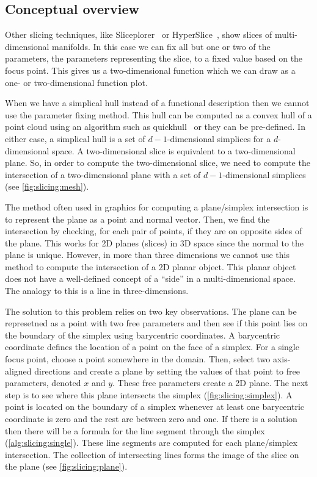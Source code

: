 \subsection{Conceptual overview}

Other slicing techniques, like Sliceplorer~\cite{Torsney-Weir:2017a} or
HyperSlice~\cite{Wijk:1993}, show slices of multi-dimensional manifolds.
In this case we can fix all but one or two of the
parameters, the parameters representing the slice, to a fixed value based on the
focus point. This gives us a two-dimensional function which we can draw as
a one- or two-dimensional function plot.

When we have a simplical hull instead of a functional description then we
cannot use the parameter fixing method. This hull can be computed as a convex
hull of a point cloud using an algorithm such as quickhull~\cite{Barber:1996}
or they can be pre-defined.  In either case, a simplical hull is a set of
\(d-1\)-dimensional simplices for a \(d\)-dimensional space. 
A two-dimensional
slice is equivalent to a two-dimensional plane. So, in order to compute the
two-dimensional slice, we need to compute the intersection of a two-dimensional
plane with a set of \(d-1\)-dimensional simplices 
(see \autoref{fig:slicing:mesh}). 

The method often used in graphics for
computing a plane/simplex intersection is to represent the plane as a point and
normal vector. Then, we find the intersection by checking, for each pair of
points, if they are on opposite sides of the plane.
This works for 2D planes (slices) in 3D space
since the normal to the plane is unique. However, in more than three dimensions
we cannot use this method to compute the intersection of a 2D planar object.
This planar object does not have a well-defined concept of a ``side'' in a
multi-dimensional space. The analogy to this is a line in three-dimensions.

The solution to this problem relies on two key observations. The plane can
be represetned as
a point with two free parameters and then see if
this point lies on the boundary of the simplex using barycentric coordinates.
A barycentric coordinate defines the location of a point on the face of a simplex.
For a single focus point, choose a point somewhere in the domain. Then,
select two axis-aligned directions and create a plane by setting the values
of that point to free parameters, denoted $x$ and $y$. These free parameters
create a 2D plane. The next step is to see where this plane intersects the simplex
(\autoref{fig:slicing:simplex}). 
A point is located on the boundary of a simplex whenever at least one
barycentric coordinate is zero and the rest are between zero and one. 
If there is a solution then there will be a formula for the line segment
through the simplex (\autoref{alg:slicing:single}).
These line segments are computed for each plane/simplex intersection. The
collection of intersecting lines forms the image of the slice on the plane
(see \autoref{fig:slicing:plane}).

